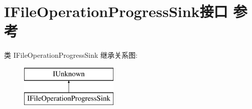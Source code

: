 \hypertarget{interface_i_file_operation_progress_sink}{}\section{I\+File\+Operation\+Progress\+Sink接口 参考}
\label{interface_i_file_operation_progress_sink}
类 I\+File\+Operation\+Progress\+Sink 继承关系图\+:\begin{figure}[H]
\begin{center}
\leavevmode
\includegraphics[height=2.000000cm]{interface_i_file_operation_progress_sink}
\end{center}
\end{figure}
